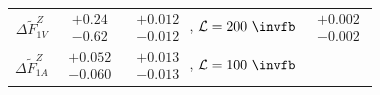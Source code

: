 \begin{table}[t]
\begin{center}
\begin{footnotesize}
\begin{tabular}{|cccc|}
$\Delta\widetilde F^Z_{1V}$ &
$\begin{matrix} +0.24 \\[-4pt]  -0.62\end{matrix}$ &
$\begin{matrix} +0.012 \\[-4pt] -0.012\end{matrix}$ , $\mathcal{L}=200~\invfb$ &
$\begin{matrix} +0.002 \\[-4pt] -0.002\end{matrix}$
\\
$\Delta\widetilde F^Z_{1A}$ &
$\begin{matrix} +0.052 \\[-4pt]  -0.060\end{matrix}$ &
$\begin{matrix} +0.013 \\[-4pt] -0.013\end{matrix}$ , $\mathcal{L}=100~\invfb$ &

\end{tabular}
\end{footnotesize}
\end{center}
\end{table}
